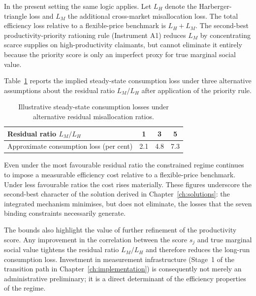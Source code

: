 \documentclass[12pt,anyside]{book}
\theoremstyle{definition}
\theoremstyle{plain}
\theoremstyle{remark}
\begin{document}
In the present setting the same logic applies. Let $L_H$ denote the Harberger-triangle loss and $L_M$ the additional cross-market misallocation loss. The total efficiency loss relative to a flexible-price benchmark is $L_H+L_M$. The second-best productivity-priority rationing rule (Instrument A1) reduces $L_M$ by concentrating scarce supplies on high-productivity claimants, but cannot eliminate it entirely because the priority score is only an imperfect proxy for true marginal social value.

Table~\ref{tab:sensitivity} reports the implied steady-state consumption loss under three alternative assumptions about the residual ratio $L_M/L_H$ after application of the priority rule.

\begin{table}[H]
\centering
\begin{tabular}{lccc}
\toprule
Residual ratio $L_M/L_H$ & 1 & 3 & 5 \\
\midrule
Approximate consumption loss (per cent) & 2.1 & 4.8 & 7.3 \\
\bottomrule
\end{tabular}
\caption{Illustrative steady-state consumption losses under alternative residual misallocation ratios.}
\label{tab:sensitivity}
\end{table}

Even under the most favourable residual ratio the constrained regime continues to impose a measurable efficiency cost relative to a flexible-price benchmark. Under less favourable ratios the cost rises materially. These figures underscore the second-best character of the solution derived in Chapter~\ref{ch:solutions}: the integrated mechanism minimises, but does not eliminate, the losses that the seven binding constraints necessarily generate.

The bounds also highlight the value of further refinement of the productivity score. Any improvement in the correlation between the score $s_j$ and true marginal social value tightens the residual ratio $L_M/L_H$ and therefore reduces the long-run consumption loss. Investment in measurement infrastructure (Stage~1 of the transition path in Chapter~\ref{ch:implementation}) is consequently not merely an administrative preliminary; it is a direct determinant of the efficiency properties of the regime.

\end{document}
